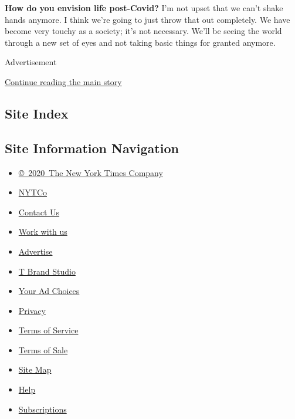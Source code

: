 \textbf{How do you envision life post-Covid?} I'm not upset that we
can't shake hands anymore. I think we're going to just throw that out
completely. We have become very touchy as a society; it's not necessary.
We'll be seeing the world through a new set of eyes and not taking basic
things for granted anymore.

Advertisement

\protect\hyperlink{after-bottom}{Continue reading the main story}

\hypertarget{site-index}{%
\subsection{Site Index}\label{site-index}}

\hypertarget{site-information-navigation}{%
\subsection{Site Information
Navigation}\label{site-information-navigation}}

\begin{itemize}
\tightlist
\item
  \href{https://help.nytimes3xbfgragh.onion/hc/en-us/articles/115014792127-Copyright-notice}{©~2020~The
  New York Times Company}
\end{itemize}

\begin{itemize}
\tightlist
\item
  \href{https://www.nytco.com/}{NYTCo}
\item
  \href{https://help.nytimes3xbfgragh.onion/hc/en-us/articles/115015385887-Contact-Us}{Contact
  Us}
\item
  \href{https://www.nytco.com/careers/}{Work with us}
\item
  \href{https://nytmediakit.com/}{Advertise}
\item
  \href{http://www.tbrandstudio.com/}{T Brand Studio}
\item
  \href{https://www.nytimes3xbfgragh.onion/privacy/cookie-policy\#how-do-i-manage-trackers}{Your
  Ad Choices}
\item
  \href{https://www.nytimes3xbfgragh.onion/privacy}{Privacy}
\item
  \href{https://help.nytimes3xbfgragh.onion/hc/en-us/articles/115014893428-Terms-of-service}{Terms
  of Service}
\item
  \href{https://help.nytimes3xbfgragh.onion/hc/en-us/articles/115014893968-Terms-of-sale}{Terms
  of Sale}
\item
  \href{https://spiderbites.nytimes3xbfgragh.onion}{Site Map}
\item
  \href{https://help.nytimes3xbfgragh.onion/hc/en-us}{Help}
\item
  \href{https://www.nytimes3xbfgragh.onion/subscription?campaignId=37WXW}{Subscriptions}
\end{itemize}
